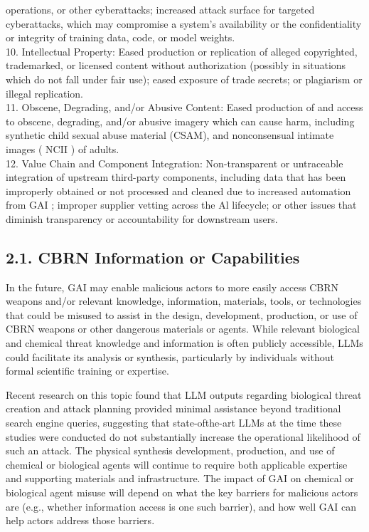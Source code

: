 \documentclass[10pt]{article}
\begin{document}
operations, or other cyberattacks; increased attack surface for targeted cyberattacks, which may compromise a system's availability or the confidentiality or integrity of training data, code, or model weights.\\
10. Intellectual Property: Eased production or replication of alleged copyrighted, trademarked, or licensed content without authorization (possibly in situations which do not fall under fair use); eased exposure of trade secrets; or plagiarism or illegal replication.\\
11. Obscene, Degrading, and/or Abusive Content: Eased production of and access to obscene, degrading, and/or abusive imagery which can cause harm, including synthetic child sexual abuse material (CSAM), and nonconsensual intimate images ( NCII ) of adults.\\
12. Value Chain and Component Integration: Non-transparent or untraceable integration of upstream third-party components, including data that has been improperly obtained or not processed and cleaned due to increased automation from GAI ; improper supplier vetting across the Al lifecycle; or other issues that diminish transparency or accountability for downstream users.
\subsection*{2.1. CBRN Information or Capabilities}
In the future, GAI may enable malicious actors to more easily access CBRN weapons and/or relevant knowledge, information, materials, tools, or technologies that could be misused to assist in the design, development, production, or use of CBRN weapons or other dangerous materials or agents. While relevant biological and chemical threat knowledge and information is often publicly accessible, LLMs could facilitate its analysis or synthesis, particularly by individuals without formal scientific training or expertise.

Recent research on this topic found that LLM outputs regarding biological threat creation and attack planning provided minimal assistance beyond traditional search engine queries, suggesting that state-ofthe-art LLMs at the time these studies were conducted do not substantially increase the operational likelihood of such an attack. The physical synthesis development, production, and use of chemical or biological agents will continue to require both applicable expertise and supporting materials and infrastructure. The impact of GAI on chemical or biological agent misuse will depend on what the key barriers for malicious actors are (e.g., whether information access is one such barrier), and how well GAI can help actors address those barriers.
\end{document}
